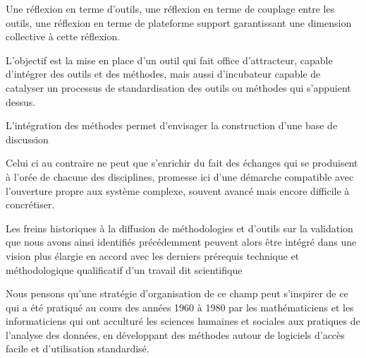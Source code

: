 Une réflexion en terme d'outils, une réflexion en terme de couplage entre les outils, une réflexion en terme de plateforme support garantissant une dimension collective à cette réflexion.

L'objectif est la mise en place d'un outil qui fait office d'attracteur,  capable d'intégrer des outils et des méthodes, mais aussi d'incubateur capable de catalyser un processus de standardisation des outils ou méthodes qui s'appuient dessus. 

L'intégration des méthodes permet d'envisager la construction d'une base de discussion

Celui ci au contraire ne peut que s'enrichir du fait des échanges qui se produisent à l'orée de chacune des disciplines, promesse ici d'une démarche compatible avec l'ouverture propre aux système complexe, souvent avancé mais encore difficile à concrétiser.
 
Les freins historiques à la diffusion de méthodologies et d'outils sur la validation que nous avons ainsi identifiés précédemment peuvent alors être intégré dans une vision plus élargie en accord avec les derniers prérequis technique et méthodologique qualificatif d'un travail dit scientifique

Nous pensons qu’une stratégie d’organisation de ce champ peut s’inspirer  de ce qui a été pratiqué au cours des années 1960 à 1980 par les mathématiciens et les informaticiens qui ont acculturé les sciences humaines et sociales aux pratiques de l'analyse des données, en développant des méthodes autour de logiciels d'accès facile et d'utilisation standardisé.
